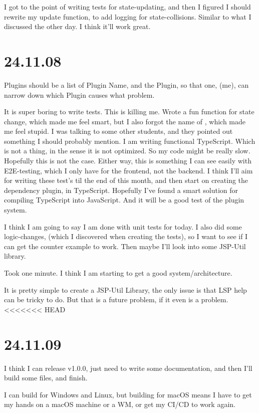 I got to the point of writing tests for state-updating, and then I figured I
should rewrite my update function, to add logging for state-collisions. Similar
to what I discussed the other day. I think it'll work great.


\section{24.11.08}

Plugins should be a list of Plugin Name, and the Plugin, so that one, (me), can
narrow down which Plugin causes what problem.

It is super boring to write tests. This is killing me. Wrote a fun function
for state change, which made me feel smart, but I also forgot the name of
, which made me feel stupid. I was talking to some other students,
and they pointed out something I should probably mention. I am writing
functional TypeScript. Which is not a thing, in the sense it is not optimized.
So my code might be really slow. Hopefully this is not the case. Either way,
this is something I can see easily with E2E-testing, which I only have for the
frontend, not the backend. I think I'll aim for writing these test's til the end
of this month, and then start on creating the dependency plugin, in TypeScript.
Hopefully I've found a smart solution for compiling TypeScript into JavaScript.
And it will be a good test of the plugin system.

I think I am going to say I am done with unit tests for today. I also did some
logic-changes, (which I discovered when creating the tests), so I want to see
if I can get the counter example to work. Then maybe I'll look into some
JSP-Util library.

Took one minute. I think I am starting to get a good system/architecture.

It is pretty simple to create a JSP-Util Library, the only issue is that LSP
help can be tricky to do. But that is a future problem, if it even is a
problem.
<<<<<<< HEAD


\section{24.11.09}

I think I can release v1.0.0, just need to write some documentation, and then
I'll build some files, and finish.

I can build for Windows and Linux, but building for macOS means I have to get
my hands on a macOS machine or a WM, or get my CI/CD to work again.

